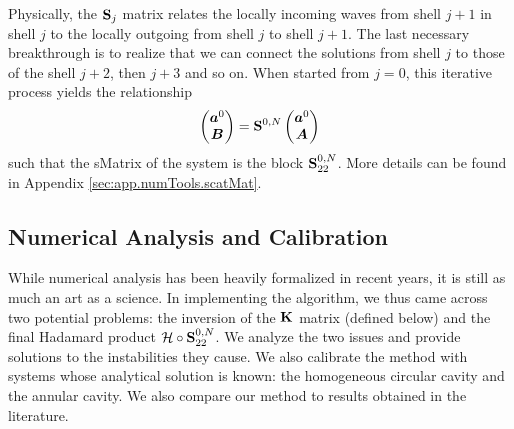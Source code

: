 Physically, the $\mathbf{S}_j$ matrix relates the locally 
incoming waves from shell $j+1$ in shell $j$ to the locally 
outgoing from shell $j$ to shell $j+1$. The last necessary
breakthrough is to realize that we can connect the solutions
from shell $j$ to those of the shell $j+2$, then $j+3$ and 
so on. When started from $j=0$, this iterative process yields
the relationship
  \begin{equation}
   \begin{pmatrix}\boldsymbol{a}^0\\\boldsymbol{B}\end{pmatrix} = \mathbf{S}^{0,N}\begin{pmatrix}\boldsymbol{a}^0\\\boldsymbol{A}\end{pmatrix}
  \end{equation}
such that the \gls{sMatrix} of the system is
the block $\mathbf{S}_{22}^{0,N}$. More details can be found
in Appendix \ref{sec:app.numTools.scatMat}. 
  
\subsection{Numerical Analysis and Calibration}
While numerical analysis has been heavily formalized in recent years, 
it is still as much an art as a science. In implementing the algorithm, 
we thus came across two potential problems: the inversion of the 
$\mathbf{K}$ matrix (defined below) and the final Hadamard product
$\mathcal{H}\circ\mathbf{S}^{0,N}_{22}$. We analyze the two issues
and provide solutions to the instabilities they cause. We also 
calibrate the method with systems whose analytical solution
is known: the homogeneous circular cavity and the annular cavity.
We also compare our method to results obtained in the literature. 

